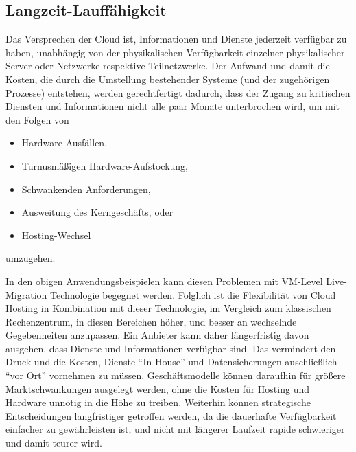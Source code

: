 \subsection{Langzeit-Lauffähigkeit}
\label{sec:langz-lauff}
Das Versprechen der Cloud ist, Informationen und Dienste jederzeit
verfügbar zu haben, unabhängig von der physikalischen Verfügbarkeit
einzelner physikalischer Server oder Netzwerke respektive
Teilnetzwerke. Der Aufwand und damit die Kosten, die durch die
Umstellung bestehender Systeme (und der zugehörigen Prozesse)
entstehen, werden gerechtfertigt dadurch, dass der Zugang zu
kritischen Diensten und Informationen nicht alle paar Monate
unterbrochen wird, um mit den Folgen von
\begin{itemize}
\item Hardware-Ausfällen,
\item Turnusmäßigen Hardware-Aufstockung,
\item Schwankenden Anforderungen,
\item Ausweitung des Kerngeschäfts, oder
\item Hosting-Wechsel
\end{itemize}
umzugehen.

In den obigen Anwendungsbeispielen kann diesen Problemen mit VM-Level
Live-Migration Technologie begegnet werden. Folglich ist die
Flexibilität von Cloud Hosting in Kombination mit dieser Technologie,
im Vergleich zum klassischen Rechenzentrum, in diesen Bereichen höher,
und besser an wechselnde Gegebenheiten anzupassen. Ein Anbieter kann
daher längerfristig davon ausgehen, dass Dienste und Informationen
verfügbar sind. Das vermindert den Druck und die Kosten, Dienste
"`In-House"' und Datensicherungen auschließlich "`vor Ort"' vornehmen
zu müssen. Geschäftsmodelle können daraufhin für größere
Marktschwankungen ausgelegt werden, ohne die Kosten für Hosting und
Hardware unnötig in die Höhe zu treiben. Weiterhin können strategische
Entscheidungen langfristiger getroffen werden, da die dauerhafte
Verfügbarkeit einfacher zu gewährleisten ist, und nicht mit längerer
Laufzeit rapide schwieriger und damit teurer wird.


